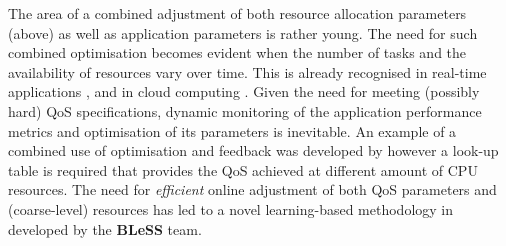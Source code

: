 \documentclass[a4paper,11pt]{article}
\newcommand{\project}[1]{\textbf{#1}\xspace}
\newcommand{\BLESS}{\project{BLeSS}}
\newcommand{\TheProject}{\BLESS}
\begin{document}
The area of a combined adjustment of both resource allocation parameters (above) as well as application parameters is rather young. The need for such combined optimisation becomes evident when the number of tasks and the availability of resources vary over time. This is already recognised in real-time applications \cite{Bini11}, and in cloud computing \cite{guerout_mixed_2017}. Given the need for meeting (possibly hard) QoS specifications, dynamic monitoring of the application performance metrics and optimisation of its  parameters is inevitable. An example of a combined use of optimisation and feedback was developed by \cite{Arz11,Bini11} however a look-up table is required that provides the QoS achieved at different amount of CPU resources. The need for \emph{efficient} online adjustment of both QoS parameters and (coarse-level) resources has led to a novel learning-based methodology in \cite{chasparis_design_2016,MagECRTS,chasparis_reinforcement-learning-based_2015} developed by the \TheProject team. 
\end{document}
